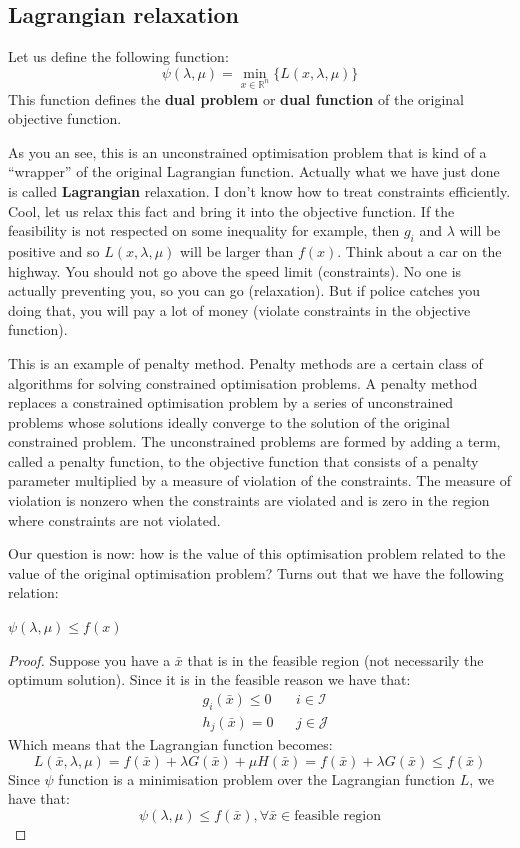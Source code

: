 \subsection{Lagrangian relaxation}
\par Let us define the following function:
\begin{equation}
    \psi(\lambda, \mu) = \min_{x \in \mathbb{R}^n}\{L(x,\lambda,\mu)\}
\end{equation}
This function defines the \textbf{dual problem} or \textbf{dual function} of the original objective function.
\par As you an see, this is an unconstrained optimisation problem that is kind of a ``wrapper'' of the original Lagrangian function. Actually what we have just done is called \textbf{Lagrangian} relaxation. I don't know how to treat constraints efficiently. Cool, let us relax this fact and bring it into the objective function. If the feasibility is not respected on some inequality for example, then $g_i$ and $\lambda$ will be positive and so $L(x,\lambda,\mu)$ will be larger than $f(x)$. Think about a car on the highway. You should not go above the speed limit (constraints). No one is actually preventing you, so you can go (relaxation). But if police catches you doing that, you will pay a lot of money (violate constraints in the objective function).
\par This is an example of penalty method. Penalty methods are a certain class of algorithms for solving constrained optimisation problems. A penalty method replaces a constrained optimisation problem by a series of unconstrained problems whose solutions ideally converge to the solution of the original constrained problem. The unconstrained problems are formed by adding a term, called a penalty function, to the objective function that consists of a penalty parameter multiplied by a measure of violation of the constraints. The measure of violation is nonzero when the constraints are violated and is zero in the region where constraints are not violated.
\par Our question is now: how is the value of this optimisation problem related to the value of the original optimisation problem? Turns out that we have the following relation:
\begin{theorem}
    $\psi(\lambda,\mu) \leq f(x)$
\end{theorem}
\begin{proof}
    Suppose you have a $\bar{x}$ that is in the feasible region (not necessarily the optimum solution). Since it is in the feasible reason we have that:
    \begin{align}
        &g_i(\bar{x}) \leq 0 && i \in \mathcal{I}\\
        &h_j(\bar{x}) = 0 && j \in \mathcal{J}
    \end{align}
    Which means that the Lagrangian function becomes:
    \[
        L(\bar{x}, \lambda, \mu) = f(\bar{x}) + \lambda G(\bar{x}) + \mu H(\bar{x}) = f(\bar{x}) + \lambda G(\bar{x}) \leq f(\bar{x})
    \]
    Since $\psi$ function is a minimisation problem over the Lagrangian function $L$, we have that:
    \[
        \psi(\lambda, \mu) \leq f(\bar{x}), \forall \bar{x} \in \mbox{feasible region}
    \]
\end{proof}
